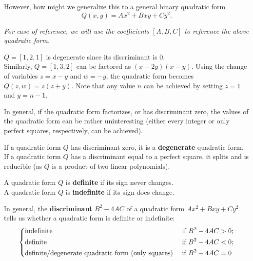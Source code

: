 \documentclass[11pt]{article}
\begin{document}
However, how might we generalize this to a general binary quadratic form
\[
    Q(x, y) = Ax^2 + Bxy + Cy^2.
\]

\textit{For ease of reference, we will use the coefficients $[A, B, C]$ to reference the above quadratic form.}

\begin{remark}
$Q = [1, 2, 1]$ is degenerate since its discriminant is $0$. \\

Similarly, $Q = [1, 3, 2]$ can be factored as $(x-2y)(x-y)$. 
Using the change of variables $z = x-y$ and $w = -y$, the quadratic form becomes $Q(z, w) = z(z+y)$. 
Note that any value $n$ can be achieved by setting $z=1$ and $y = n-1$.

In general, if the quadratic form factorizes, or has discriminant zero, the values of the quadratic form can be rather uninteresting
(either every integer or only perfect squares, respectively, can be achieved).
\end{remark}

\begin{definition}
If a quadratic form $Q$ has discriminant zero, it is a \textbf{degenerate} quadratic form. \\

If a quadratic form $Q$ has a discriminant equal to a perfect square, it splits and is reducible 
(as $Q$ is a product of two linear polynomials).
\end{definition}

\begin{definition}
A quadratic form $Q$ is \textbf{definite} if its sign never changes. \\

A quadratic form $Q$ is \textbf{indefinite} if its sign does change. \\
\end{definition}

\begin{remark}
    In general, the \textbf{discriminant} $B^2 - 4AC$ of a quadratic form $Ax^2 + Bxy + Cy^2$ tells us whether a quadratic form is definite or indefinite:
    \[
        \begin{dcases}
            \text{indefinite } & \text{ if } B^2 - 4AC > 0 ;\\
            \text{definite} & \text{ if } B^2 - 4AC < 0  ;\\
            \text{definite/degenerate quadratic form (only squares)} & \text{ if } B^2 - 4AC = 0
        \end{dcases}
    \]
\end{remark}
\end{document}
